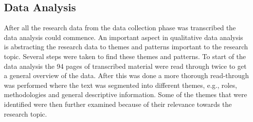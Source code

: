 \subsection{Data Analysis}

After all the research data from the data collection phase was transcribed the data analysis could commence. An important aspect in qualitative data analysis is abstracting the research data to themes and patterns important to the research topic. Several steps were taken to find these themes and patterns. To start of the data analysis the 94 pages of transcribed material were read through twice to get a general overview of the data. After this was done a more thorough read-through was performed where the text was segmented into different themes, e.g., roles, methodologies and general descriptive information. Some of the themes that were identified were then further examined because of their relevance towards the research topic.
